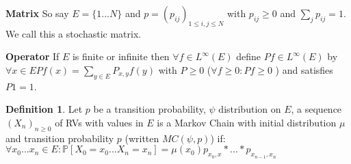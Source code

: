 \documentclass[12pt]{book}
\theoremstyle{definition}
\newtheorem{defn}{Definition}[section]
\theoremstyle{remark}
\begin{document}
\textbf{Matrix} So say $E=\{1...N\}$ and $p=(p_{ij})_{1\leq i,j\leq N}$ with $p_{ij}\geq 0$ and $\sum_{j}p_{ij}=1$. We call this a stochastic matrix.

\textbf{Operator} If $E$ is finite or infinite then $\forall f \in L^\infty (E)$ define $Pf \in L^\infty (E)$ by  $\forall x \in E Pf(x)=\sum_{y \in E}P_{x,y}f(y)$ with $P\geq 0 $ ($\forall  f \geq 0: Pf \geq 0$ ) and satisfies $P1=1$.

\begin{defn}
	Let $p$ be a transition probability, $\psi$ distribution on $E$, a sequence $(X_n)_{n\geq 0}$ of RVs with values in $E $ is a Markov Chain with initial distribution $\mu$ and transition probability $p$ (written $MC(\psi, p)$) if:
	$\forall  x_0...x_n \in E: \mathbb{P} \left[ X_0=x_0...X_n=x_n \right] = \mu(x_0)p_{x_0,x}*...*p_{x_{n-1},x_{n}}$

\end{defn}
\end{document}
